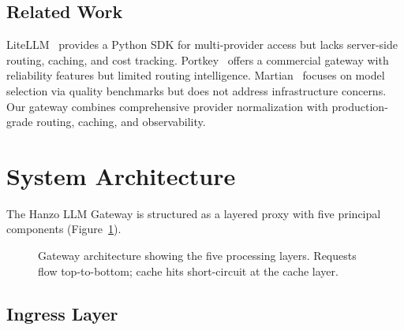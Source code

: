 \documentclass[11pt,twocolumn]{article}
\begin{document}
\subsection{Related Work}

LiteLLM~\cite{litellm2023} provides a Python SDK for multi-provider access but lacks server-side routing, caching, and cost tracking. Portkey~\cite{portkey2024} offers a commercial gateway with reliability features but limited routing intelligence. Martian~\cite{martian2024} focuses on model selection via quality benchmarks but does not address infrastructure concerns. Our gateway combines comprehensive provider normalization with production-grade routing, caching, and observability.

\section{System Architecture}
\label{sec:architecture}

The Hanzo LLM Gateway is structured as a layered proxy with five principal components (Figure~\ref{fig:architecture}).

\begin{figure}[t]
\centering
{}
\caption{Gateway architecture showing the five processing layers. Requests flow top-to-bottom; cache hits short-circuit at the cache layer.}
\label{fig:architecture}
\end{figure}

\subsection{Ingress Layer}
\end{document}

